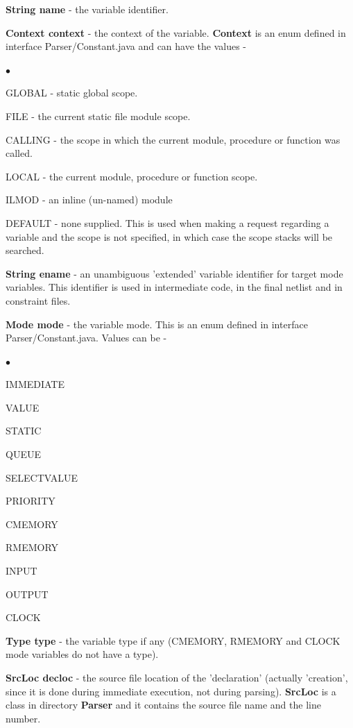 \documentclass[10pt,a4paper,twoside,fleqn]{book}
\newcommand{\blist}{\begin{list}{$\bullet$}{\setlength{\itemsep}{-5pt}\setlength{\topsep}{-5pt}}}
\newcommand{\blend}{\end{list}}
\begin{document}
            {\bf String name} - the variable identifier.

            {\bf Context context} - the context of the variable. {\bf Context}
            is an enum defined in interface Parser/Constant.java and can have the
            values -
            \blist
            \item   GLOBAL - static global scope.
            \item   FILE - the current static file module scope.
            \item   CALLING - the scope in which the current module, procedure
                    or function was called.
            \item   LOCAL - the current module, procedure or function scope.
            \item   ILMOD - an inline (un-named) module
            \item   DEFAULT - none supplied. This is used when making a request
                    regarding a variable and the scope is not specified, in which
                    case the scope stacks will be searched.
            \blend

            {\bf String ename} - an unambiguous 'extended' variable identifier for
            target mode variables. This identifier is used in intermediate code,
            in the final netlist and in constraint files.

            {\bf Mode mode} - the variable mode. This is an enum defined in
            interface Parser/Constant.java. Values can be -
            \blist
            \item   IMMEDIATE
            \item   VALUE
            \item   STATIC
            \item   QUEUE
            \item   SELECTVALUE
            \item   PRIORITY
            \item   CMEMORY
            \item   RMEMORY
            \item   INPUT
            \item   OUTPUT
            \item   CLOCK
            \blend

            {\bf Type type} - the variable type if any (CMEMORY, RMEMORY and
            CLOCK mode variables do not have a type).

            {\bf SrcLoc decloc} - the source file location of the 'declaration'
            (actually 'creation', since it is done during immediate execution, not
            during parsing). {\bf SrcLoc} is a class in directory {\bf Parser} and
            it contains the source file name and the line number.
\end{document}
